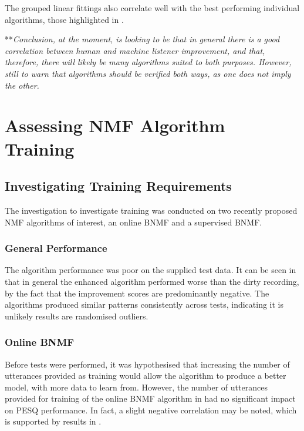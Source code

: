 The grouped linear fittings also correlate well with the best performing
individual algorithms, those highlighted in .

{*}{*}\textit{Conclusion, at the moment, is looking to be that in
general there is a good correlation between human and machine listener
improvement, and that, therefore, there will likely be many algorithms
suited to both purposes. However, still to warn that algorithms should
be verified both ways, as one does not imply the other.}


\section{Assessing \acl{NMF} Algorithm Training}


\subsection{Investigating Training Requirements}

The investigation to investigate training was conducted on two recently
proposed \ac{NMF} algorithms of interest, an online \ac{BNMF} and
a supervised \ac{BNMF}.


\subsubsection*{General Performance}

The algorithm performance was poor on the supplied test data. It can
be seen in  that in general the enhanced
algorithm performed worse than the dirty recording, by the fact that
the improvement scores are predominantly negative. The algorithms
produced similar patterns consistently across tests, indicating it
is unlikely results are randomised outliers.


\subsubsection*{Online \acl{BNMF}}

Before tests were performed, it was hypothesised that increasing the
number of utterances provided as training would allow the algorithm
to produce a better model, with more data to learn from. However,
the number of utterances provided for training of the online \ac{BNMF}
algorithm in  had no significant impact on
\ac{PESQ} performance. In fact, a slight negative correlation may
be noted, which is supported by results in .%

